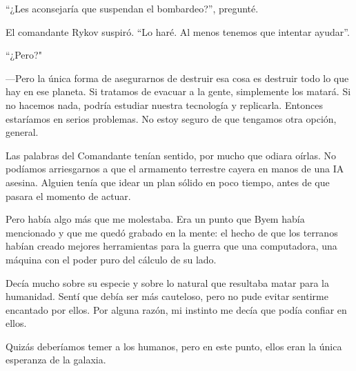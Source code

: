 “¿Les aconsejaría que suspendan el bombardeo?”, pregunté.

El comandante Rykov suspiró. “Lo haré. Al menos tenemos que intentar ayudar”.

``¿Pero?"

—Pero la única forma de asegurarnos de destruir esa cosa es destruir todo lo que hay en ese planeta. Si tratamos de evacuar a la gente, simplemente los matará. Si no hacemos nada, podría estudiar nuestra tecnología y replicarla. Entonces estaríamos en serios problemas. No estoy seguro de que tengamos otra opción, general.

Las palabras del Comandante tenían sentido, por mucho que odiara oírlas. No podíamos arriesgarnos a que el armamento terrestre cayera en manos de una IA asesina. Alguien tenía que idear un plan sólido en poco tiempo, antes de que pasara el momento de actuar.

Pero había algo más que me molestaba. Era un punto que Byem había mencionado y que me quedó grabado en la mente: el hecho de que los terranos habían creado mejores herramientas para la guerra que una computadora, una máquina con el poder puro del cálculo de su lado.

Decía mucho sobre su especie y sobre lo natural que resultaba matar para la humanidad. Sentí que debía ser más cauteloso, pero no pude evitar sentirme encantado por ellos. Por alguna razón, mi instinto me decía que podía confiar en ellos.

Quizás deberíamos temer a los humanos, pero en este punto, ellos eran la única esperanza de la galaxia.

